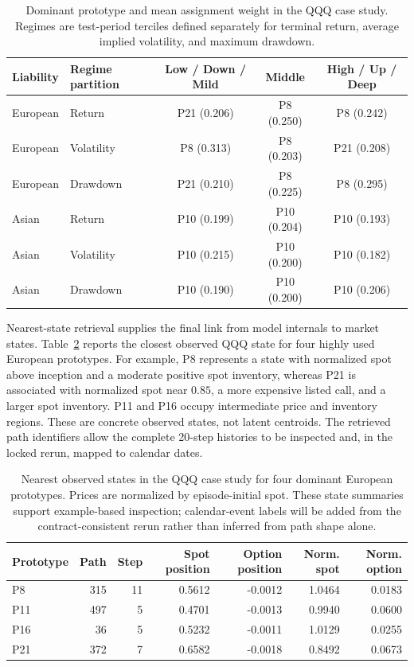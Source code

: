 \documentclass[sigconf]{acmart}
\begin{document}
\begin{table}[t]
\centering
\small
\begin{tabular}{llccc}
\toprule
Liability & Regime partition & Low / Down / Mild & Middle & High / Up / Deep \\
\midrule
European & Return & P21 (0.206) & P8 (0.250) & P8 (0.242) \\
European & Volatility & P8 (0.313) & P8 (0.203) & P21 (0.208) \\
European & Drawdown & P21 (0.210) & P8 (0.225) & P8 (0.295) \\
Asian & Return & P10 (0.199) & P10 (0.204) & P10 (0.193) \\
Asian & Volatility & P10 (0.215) & P10 (0.200) & P10 (0.182) \\
Asian & Drawdown & P10 (0.190) & P10 (0.200) & P10 (0.206) \\
\bottomrule
\end{tabular}
\caption{Dominant prototype and mean assignment weight in the QQQ case study.
Regimes are test-period terciles defined separately for terminal return,
average implied volatility, and maximum drawdown.}
\label{tab:prototype-regimes}
\end{table}

Nearest-state retrieval supplies the final link from model internals to market
states. Table~\ref{tab:nearest-states} reports the closest observed QQQ state
for four highly used European prototypes. For example, P8 represents a state
with normalized spot above inception and a moderate positive spot inventory,
whereas P21 is associated with normalized spot near $0.85$, a more expensive
listed call, and a larger spot inventory. P11 and P16 occupy intermediate
price and inventory regions. These are concrete observed states, not latent
centroids. The retrieved path identifiers allow the complete 20-step histories
to be inspected and, in the locked rerun, mapped to calendar dates.

\begin{table}[t]
\centering
\small
\begin{tabular}{lrrrrrr}
\toprule
Prototype & Path & Step & Spot position & Option position & Norm. spot & Norm. option \\
\midrule
P8  & 315 & 11 & 0.5612 & -0.0012 & 1.0464 & 0.0183 \\
P11 & 497 & 5  & 0.4701 & -0.0013 & 0.9940 & 0.0600 \\
P16 & 36  & 5  & 0.5232 & -0.0011 & 1.0129 & 0.0255 \\
P21 & 372 & 7  & 0.6582 & -0.0018 & 0.8492 & 0.0673 \\
\bottomrule
\end{tabular}
\caption{Nearest observed states in the QQQ case study for four dominant
European prototypes. Prices are normalized by episode-initial spot. These
state summaries support example-based inspection; calendar-event labels will
be added from the contract-consistent rerun rather than inferred from path
shape alone.}
\label{tab:nearest-states}
\end{table}
\end{document}
